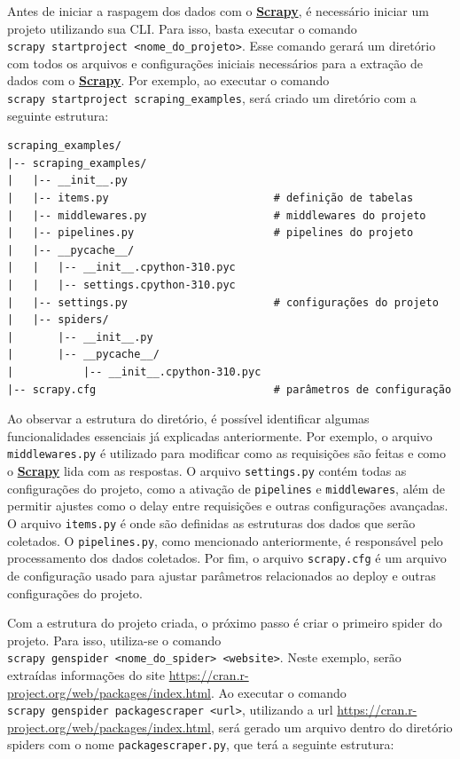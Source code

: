 \documentclass[
  12pt,
  a4paper,
]{scrreprt}
\begin{document}
\vspace{12pt}

Antes de iniciar a raspagem dos dados com o
\href{https://docs.scrapy.org/en/latest}{\textbf{Scrapy}}, é necessário
iniciar um projeto utilizando sua CLI. Para isso, basta executar o
comando
\texttt{scrapy\ startproject\ \textless{}nome\_do\_projeto\textgreater{}}.
Esse comando gerará um diretório com todos os arquivos e configurações
iniciais necessários para a extração de dados com o
\href{https://docs.scrapy.org/en/latest}{\textbf{Scrapy}}. Por exemplo,
ao executar o comando \texttt{scrapy\ startproject\ scraping\_examples},
será criado um diretório com a seguinte estrutura:

\begin{verbatim}
scraping_examples/
|-- scraping_examples/
|   |-- __init__.py
|   |-- items.py                          # definição de tabelas
|   |-- middlewares.py                    # middlewares do projeto
|   |-- pipelines.py                      # pipelines do projeto
|   |-- __pycache__/
|   |   |-- __init__.cpython-310.pyc
|   |   |-- settings.cpython-310.pyc
|   |-- settings.py                       # configurações do projeto
|   |-- spiders/
|       |-- __init__.py
|       |-- __pycache__/
|           |-- __init__.cpython-310.pyc
|-- scrapy.cfg                            # parâmetros de configuração
\end{verbatim}

Ao observar a estrutura do diretório, é possível identificar algumas
funcionalidades essenciais já explicadas anteriormente. Por exemplo, o
arquivo \texttt{middlewares.py} é utilizado para modificar como as
requisições são feitas e como o
\href{https://docs.scrapy.org/en/latest}{\textbf{Scrapy}} lida com as
respostas. O arquivo \texttt{settings.py} contém todas as configurações
do projeto, como a ativação de \texttt{pipelines} e
\texttt{middlewares}, além de permitir ajustes como o delay entre
requisições e outras configurações avançadas. O arquivo
\texttt{items.py} é onde são definidas as estruturas dos dados que serão
coletados. O \texttt{pipelines.py}, como mencionado anteriormente, é
responsável pelo processamento dos dados coletados. Por fim, o arquivo
\texttt{scrapy.cfg} é um arquivo de configuração usado para ajustar
parâmetros relacionados ao deploy e outras configurações do projeto.

\vspace{12pt}

Com a estrutura do projeto criada, o próximo passo é criar o primeiro
spider do projeto. Para isso, utiliza-se o comando
\texttt{scrapy\ genspider\ \textless{}nome\_do\_spider\textgreater{}\ \textless{}website\textgreater{}}.
Neste exemplo, serão extraídas informações do site
\url{https://cran.r-project.org/web/packages/index.html}. Ao executar o
comando
\texttt{scrapy\ genspider\ packagescraper\ \textless{}url\textgreater{}},
utilizando a url
\url{https://cran.r-project.org/web/packages/index.html}, será gerado um
arquivo dentro do diretório spiders com o nome
\texttt{packagescraper.py}, que terá a seguinte estrutura:
\end{document}

